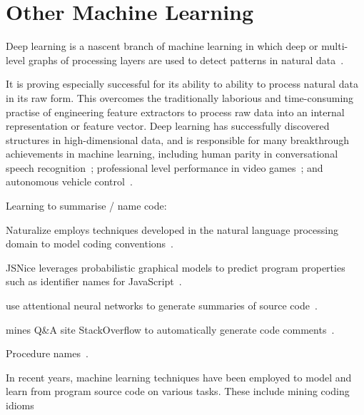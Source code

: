 \section{Other Machine Learning}
\label{sec:related-work-other}

Deep learning is a nascent branch of machine learning in which deep or multi-level graphs of processing layers are used to detect patterns in natural data~\cite{LeCun2015,Wang2017}.

It is proving especially successful for its ability to ability to process natural data in its raw form. This overcomes the traditionally laborious and time-consuming practise of engineering feature extractors to process raw data into an internal representation or feature vector. Deep learning has successfully discovered structures in high-dimensional data, and is responsible for many breakthrough achievements in machine learning, including human parity in conversational speech recognition~\cite{Xiong2016}; professional level performance in video games~\cite{Mnih2015}; and autonomous vehicle control~\cite{Lozano-Perez2012}.


Learning to summarise / name code:

\cite{Allamanis2017a}

Naturalize employs techniques developed in the natural language processing domain to model coding conventions~\cite{Allamanis2014a}.

JSNice leverages probabilistic graphical models to predict program properties such as identifier names for JavaScript~\cite{Raychev}.

\citeauthor{Allamanis2016} use attentional neural networks to generate summaries of source code~\cite{Allamanis2016}.

\citeauthor{Wong2013} mines Q\&A site StackOverflow to automatically generate code comments~\cite{Wong2013}.

Procedure names~\cite{David}.

In recent years, machine learning techniques have been employed to model and learn from program source code on various tasks. These include mining coding  idioms~\cite{Allamanis2014}

